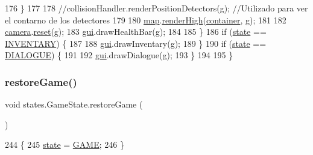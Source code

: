 \begin{DoxyCode}
176             \}
177             
178             \textcolor{comment}{//collisionHandler.renderPositionDetectors(g); //Utilizado para ver el contarno de los
       detectores}
179             
180             \mbox{\hyperlink{classstates_1_1_game_state_ab5dc1b5f4f87c6fc5684832bfba3b939}{map}}.\mbox{\hyperlink{classentities_1_1_map_a5089d63a94806cd3e9d2bdd0d31a799e}{renderHigh}}(\mbox{\hyperlink{classstates_1_1_game_state_a88b0df4b57ada742c53e4e1ee3b25827}{container}}, g);
181             
182             \mbox{\hyperlink{classstates_1_1_game_state_a0ed0ff756171316575f1bb875591b14d}{camera}}.\mbox{\hyperlink{classentities_1_1_camera_a89429480df11ec77d4b6e76672d77e96}{reset}}(g);
183             \mbox{\hyperlink{namespacegui}{gui}}.drawHealthBar(g);
184             
185         \}
186         \textcolor{keywordflow}{if} (\mbox{\hyperlink{classstates_1_1_game_state_a5e07b1776e13d009e1a8c6a1e8140d04}{state}} == \mbox{\hyperlink{classstates_1_1_game_state_a4cc6c1ac20c3d3590424e5b199a4663c}{INVENTARY}}) \{
187             
188             \mbox{\hyperlink{namespacegui}{gui}}.drawInventary(g);
189         \}
190         \textcolor{keywordflow}{if} (\mbox{\hyperlink{classstates_1_1_game_state_a5e07b1776e13d009e1a8c6a1e8140d04}{state}} == \mbox{\hyperlink{classstates_1_1_game_state_ae5ee1ef1d4462e5a6667b05addc61fb6}{DIALOGUE}}) \{
191             
192             \mbox{\hyperlink{namespacegui}{gui}}.drawDialogue(g);
193         \}
194 
195     \}
\end{DoxyCode}
\mbox{\label{classstates_1_1_game_state_a124cf2badd7eb25cf101898d6542a052}} 
\subsubsection{\texorpdfstring{restore\+Game()}{restoreGame()}}
{\footnotesize\ttfamily void states.\+Game\+State.\+restore\+Game (\begin{DoxyParamCaption}{ }\end{DoxyParamCaption})\hspace{0.3cm}{\ttfamily [inline]}}


\begin{DoxyCode}
244                               \{
245         \mbox{\hyperlink{classstates_1_1_game_state_a5e07b1776e13d009e1a8c6a1e8140d04}{state}} = \mbox{\hyperlink{classstates_1_1_game_state_a8617f1d8be7bed020eeab9384e731bc6}{GAME}};
246     \}
\end{DoxyCode}
\mbox{\label{classstates_1_1_game_state_a4429ea297dfd50415f68436e93ee4a43}} 
